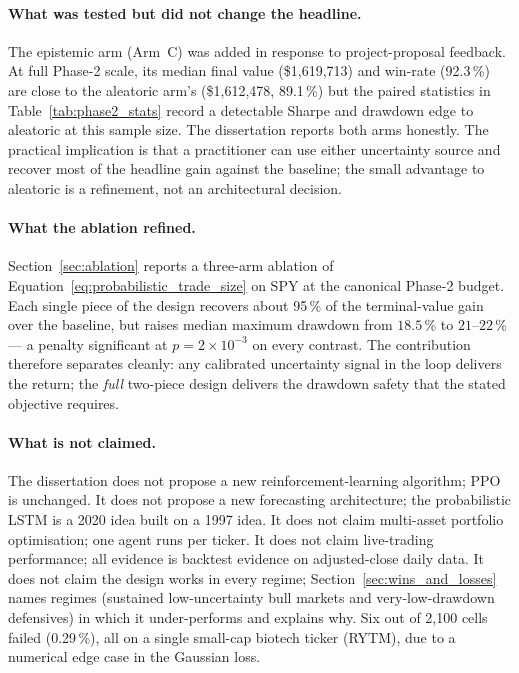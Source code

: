 \paragraph{What was tested but did not change the headline.} The epistemic arm (Arm~C) was added in response to project-proposal feedback. At full Phase-2 scale, its median final value (\$1,619,713) and win-rate (92.3\,\%) are close to the aleatoric arm's (\$1,612,478, 89.1\,\%) but the paired statistics in Table~\ref{tab:phase2_stats} record a detectable Sharpe and drawdown edge to aleatoric at this sample size. The dissertation reports both arms honestly. The practical implication is that a practitioner can use either uncertainty source and recover most of the headline gain against the baseline; the small advantage to aleatoric is a refinement, not an architectural decision.

\paragraph{What the ablation refined.} Section~\ref{sec:ablation} reports a three-arm ablation of Equation~\ref{eq:probabilistic_trade_size} on SPY at the canonical Phase-2 budget. Each single piece of the design recovers about 95\,\% of the terminal-value gain over the baseline, but raises median maximum drawdown from $18.5$\,\% to $21$--$22$\,\% --- a penalty significant at $p = 2 \times 10^{-3}$ on every contrast. The contribution therefore separates cleanly: any calibrated uncertainty signal in the loop delivers the return; the \emph{full} two-piece design delivers the drawdown safety that the stated objective requires.

\paragraph{What is not claimed.} The dissertation does not propose a new reinforcement-learning algorithm; PPO is unchanged. It does not propose a new forecasting architecture; the probabilistic LSTM is a 2020 idea built on a 1997 idea. It does not claim multi-asset portfolio optimisation; one agent runs per ticker. It does not claim live-trading performance; all evidence is backtest evidence on adjusted-close daily data. It does not claim the design works in every regime; Section~\ref{sec:wins_and_losses} names regimes (sustained low-uncertainty bull markets and very-low-drawdown defensives) in which it under-performs and explains why. Six out of 2,100 cells failed (0.29\,\%), all on a single small-cap biotech ticker (RYTM), due to a numerical edge case in the Gaussian loss.


